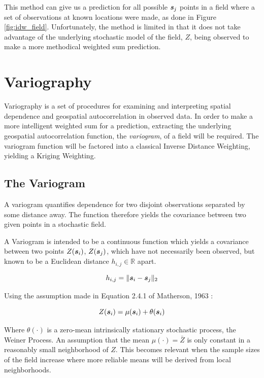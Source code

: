 \documentclass[11pt]{ucthesis}
\newcommand{\vect}[1]{{\it{\boldsymbol{#1}}}}
\begin{document}
This method can give us a prediction for all possible $\vect{s}_j$ points in a field where a set of observations at known locations were made, as done in Figure \ref{fig:idw_field}. Unfortunately, the method is limited in that it does not take advantage of the underlying stochastic model of the field, $Z$, being observed to make a more methodical weighted sum prediction.

\section{Variography} \label{sec:vario}
Variography is a set of procedures for examining and interpreting spatial dependence and geospatial autocorrelation in observed data. In order to make a more intelligent weighted sum for a prediction, extracting the underlying geospatial autocorrelation function, the \textit{variogram}, of a field will be required. The variogram function will be factored into a classical Inverse Distance Weighting, yielding a Kriging Weighting.

\subsection{The Variogram}
A variogram quantifies dependence for two disjoint observations separated by some distance away. The function therefore yields the covariance between two given points in a stochastic field.

A Variogram is intended to be a continuous function which yields a covariance between two points $Z(\vect{s}_{i})$, $Z(\vect{s}_{j})$, which have not necessarily been observed, but known to be a Euclidean distance $h_{i,j} \in \mathbb{R}$ apart. 

\begin{equation}
h_{i,j} = \| \vect{s}_i - \vect{s}_j \|_2
\end{equation}

Using the assumption made in Equation 2.4.1 of Matherson, 1963 \cite{matheron:geostat}:

\begin{equation}
    Z(\vect{s}_i)=\mu(\vect{s}_i)+\theta(\vect{s}_i)
    \label{eq:matheron:assum}
\end{equation}

Where $\theta(\cdot)$ is a zero-mean intrinsically stationary stochastic process, the Weiner Process. An assumption that the mean $\mu(\cdot) = \bar{Z}$ is only constant in a reasonably small neighborhood of $Z$. This becomes relevant when the sample sizes of the field increase where more reliable means will be derived from local neighborhoods.
\end{document}

